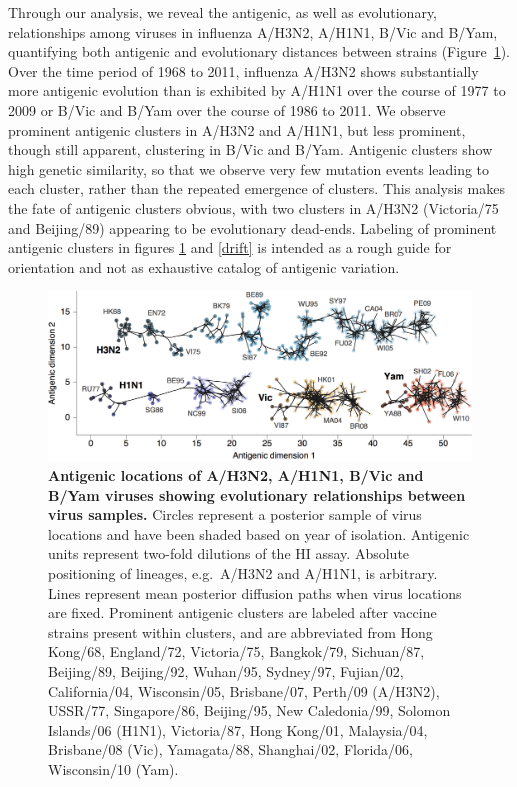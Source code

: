 \documentclass[11pt,oneside,letterpaper]{article}
\begin{document}
Through our analysis, we reveal the antigenic, as well as evolutionary, relationships among viruses in influenza A/H3N2, A/H1N1, B/Vic and B/Yam, quantifying both antigenic and evolutionary distances between strains (Figure~\ref{map}).
Over the time period of 1968 to 2011, influenza A/H3N2 shows substantially more antigenic evolution than is exhibited by A/H1N1 over the course of 1977 to 2009 or B/Vic and B/Yam over the course of 1986 to 2011.
We observe prominent antigenic clusters in A/H3N2 and A/H1N1, but less prominent, though still apparent, clustering in B/Vic and B/Yam.
Antigenic clusters show high genetic similarity, so that we observe very few mutation events leading to each cluster, rather than the repeated emergence of clusters.
This analysis makes the fate of antigenic clusters obvious, with two clusters in A/H3N2 (Victoria/75 and Beijing/89) appearing to be evolutionary dead-ends.
Labeling of prominent antigenic clusters in figures \ref{map} and \ref{drift} is intended as a rough guide for orientation and not as exhaustive catalog of antigenic variation.

\begin{figure}[h]
	\centering		
	\includegraphics[width=1.0\textwidth]{figures/map}
	\caption{\textbf{Antigenic locations of A/H3N2, A/H1N1, B/Vic and B/Yam viruses showing evolutionary relationships between virus samples.} 
	Circles represent a posterior sample of virus locations and have been shaded based on year of isolation.
	Antigenic units represent two-fold dilutions of the HI assay.
	Absolute positioning of lineages, e.g.\ A/H3N2 and A/H1N1, is arbitrary.
	Lines represent mean posterior diffusion paths when virus locations are fixed.
	Prominent antigenic clusters are labeled after vaccine strains present within clusters, and are abbreviated from Hong Kong/68, England/72, Victoria/75, Bangkok/79, Sichuan/87, Beijing/89, Beijing/92, Wuhan/95, Sydney/97, Fujian/02, California/04, Wisconsin/05, Brisbane/07, Perth/09 (A/H3N2), USSR/77, Singapore/86, Beijing/95, New Caledonia/99, Solomon Islands/06 (H1N1), Victoria/87, Hong Kong/01, Malaysia/04, Brisbane/08 (Vic), Yamagata/88, Shanghai/02, Florida/06, Wisconsin/10 (Yam).} 
	\label{map} 
\end{figure}
\end{document}

